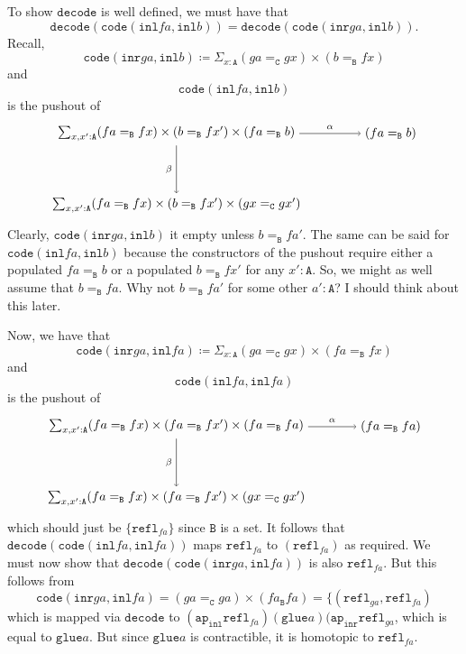 \documentclass[12pt]{amsart}
\newcommand{\type}[1]{\mathtt{#1}}
\newcommand{\A}{\type{A}}
\newcommand{\B}{\type{B}}
\newcommand{\C}{\type{C}}
\newcommand{\ap}{\type{ap}}
\newcommand{\inl}{\type{inl}}
\newcommand{\inr}{\type{inr}}
\newcommand{\glue}{\type{glue}}
\newcommand{\refl}{\type{refl}}
\newcommand{\code}{\type{code}}
\newcommand{\decode}{\type{decode}}
\theoremstyle{remark}
\theoremstyle{definition}
\begin{document}
To show \( \decode \)  is well defined, we must have that 
\[
  \decode ( \code (\inl fa,\inl b) ) = \decode ( \code (\inr ga, \inl b) ).
\]
Recall,  
\[
  \code (\inr ga, \inl b) \coloneqq \Sigma_{x:\A} ( ga =_{\C} gx)
  \times ( b =_{\B} fx )
\]
and
\[
  \code ( \inl fa, \inl b)
\]
is the pushout of
\[
\begin{tikzpicture}
	\node (1) at (0,2) 
		{ $ \sum_{ x , x' : \A } 
			( fa =_{\B} fx ) 
			\times ( b =_{\B} fx' ) 
			\times ( fa =_{\B} b ) $ };
	\node (2) at (6,2) 
		{ $ ( fa =_{\B} b ) $ };
	\node (3) at (0,0) 
		{ $ \sum_{ x , x' : \A } 
			( fa =_{\B} fx ) 
			\times  (b =_{\B} fx' ) 
			\times ( gx =_{\C} gx') $ };
	\draw [ -> ] (1) to 
		node [above] {\scriptsize $ \alpha $} 
		(2);
	\draw [ -> ] (1) to 
		node [left] {\scriptsize $ \beta $}
		(3);
\end{tikzpicture}
\]
Clearly, \( \code ( \inr ga, \inl b ) \) it empty unless \( b =_{\B}
fa' \). The same can be said for \( \code ( \inl fa , \inl b ) \)
because the constructors of the pushout require either a populated \(
fa =_{\B} b \) or a populated \( b =_{\B} fx' \) for any \( x' : \A
\). So, we might as well assume that \( b =_{\B} fa \).  Why not \( b
=_{\B} fa' \) for some other \( a' : \A \)? I should think about this
later.

Now, we have that
\[
  \code (\inr ga, \inl fa) \coloneqq \Sigma_{x:\A} ( ga =_{\C} gx)
  \times ( fa =_{\B} fx )
\]
and
\[
  \code ( \inl fa, \inl fa)
\]
is the pushout of
\[
\begin{tikzpicture}
	\node (1) at (0,2) 
		{ $ \sum_{ x , x' : \A } 
			( fa =_{\B} fx ) 
			\times ( fa =_{\B} fx' ) 
			\times ( fa =_{\B} fa ) $ };
	\node (2) at (6,2) 
		{ $ ( fa =_{\B} fa ) $ };
	\node (3) at (0,0) 
		{ $ \sum_{ x , x' : \A } 
			( fa =_{\B} fx ) 
			\times  (fa =_{\B} fx' ) 
			\times ( gx =_{\C} gx') $ };
	\draw [ -> ] (1) to 
		node [above] {\scriptsize $ \alpha $} 
		(2);
	\draw [ -> ] (1) to 
		node [left] {\scriptsize $ \beta $}
		(3);
\end{tikzpicture}
\]
which should just be \( \{ \refl_{fa} \} \) since \( \B \) is a set.
It follows that \( \decode ( \code ( \inl fa , \inl fa ) ) \) maps \(
\refl_{fa} \) to \( (\refl_{fa}) \) as required.  We must now show
that \( \decode ( \code ( \inr ga , \inl fa ) ) \) is also \(
\refl_{fa} \).  But this follows from
\[
  \code ( \inr ga , \inl fa ) = (ga =_{\C} ga) \times ( fa _{\B} fa )
  = \{(\refl_{ga}, \refl_{fa})
\]
which is mapped via \( \decode \) to \( ( \ap_{\inl} \refl_{fa} ) (
\glue a ) ( \ap_{\inr} \refl_{ga} \), which is equal to \( \glue a \).
But since \( \glue a \) is contractible, it is homotopic to \( \refl_{fa} \).   
\end{document}
